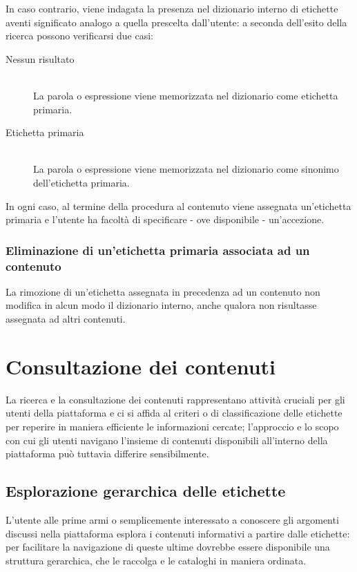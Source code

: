 \documentclass[10pt,a4paper,headinclude,footinclude,hidelinks]{scrreprt} %
\begin{document}
	In caso contrario, viene indagata la presenza nel dizionario interno di etichette aventi significato analogo a quella prescelta dall'utente: a seconda dell'esito della ricerca possono verificarsi due casi:
	\begin{description}
	\item[Nessun risultato] \hfill \\
	La parola o espressione viene memorizzata nel dizionario come etichetta primaria.
	\item[Etichetta primaria] \hfill \\
	La parola o espressione viene memorizzata nel dizionario come sinonimo dell'etichetta primaria.
	\end{description}

	In ogni caso, al termine della procedura al contenuto viene assegnata un'etichetta primaria e l'utente ha facoltà di specificare - ove disponibile - un'accezione.
	\subsubsection{Eliminazione di un'etichetta primaria associata ad un contenuto}
	La rimozione di un'etichetta assegnata in precedenza ad un contenuto non modifica in alcun modo il dizionario interno, anche qualora non risultasse assegnata ad altri contenuti.

	\section{Consultazione dei contenuti}
	\label{sec:stage:cls:scenari:read}
	La ricerca e la consultazione dei contenuti rappresentano attività cruciali per gli utenti della piattaforma e ci si affida al criteri	o di classificazione delle etichette per reperire in maniera efficiente le informazioni cercate; l'approccio e lo scopo con cui gli utenti navigano l'insieme di contenuti disponibili all'interno della piattaforma può tuttavia differire sensibilmente.
	\subsection{Esplorazione gerarchica delle etichette}
	L'utente alle prime armi o semplicemente interessato a conoscere gli argomenti discussi nella piattaforma esplora i contenuti informativi a partire dalle etichette: per facilitare la navigazione di queste ultime dovrebbe essere disponibile una struttura gerarchica, che le raccolga e le cataloghi in maniera ordinata.
\end{document}
